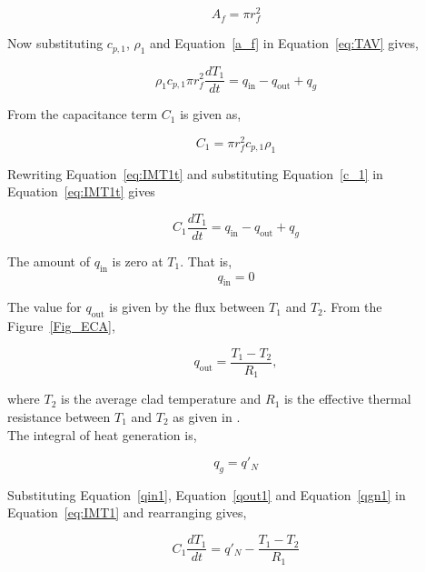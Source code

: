 \begin{equation}
A_f=\pi r_f^2 \label{a_f}
\end{equation}

Now substituting $c_{p,1}$, $\rho_1$ and Equation~\ref{a_f} in  Equation~\ref{eq:TAV} gives,

\begin{equation}
\rho_1 c_{p,1} \pi r_f^2 \frac{dT_1}{dt} = q_{\mathrm{in}}-q_{\mathrm{out}}+q_g \label{eq:IMT1t}
\end{equation}

From  the capacitance term $C_1$ is given as,

\begin{equation}
C_1  = \pi r_f^2 c_{p,1}\rho_1 \label{c_1}
\end{equation}

Rewriting Equation~\ref{eq:IMT1t} and substituting Equation~\ref{c_1} in Equation~\ref{eq:IMT1t} gives

\begin{equation}
C_1 \frac{dT_1}{dt} = q_{\mathrm{in}}-q_{\mathrm{out}}+q_g \label{eq:IMT1}
\end{equation}

The amount of $q_{\text{in}}$  is zero at $T_1$. That is,
\begin{equation}
q_{\text{in}}=0 \label{qin1}
\end{equation}

The value for $q_{\text{out}}$ is given by the flux between $T_1$ and $T_2$.
From the Figure~\ref{Fig_ECA},

\begin{equation}
q_{\text{out}}=\frac{T_1-T_2}{R_1}, \label{qout1}
\end{equation}

where $T_2$ is the average clad temperature and $R_1$ is the effective thermal
resistance between $T_1$ and $T_2$ as given in .
\\

The integral of heat generation is,

\begin{equation}
q_{g}=q'_N \label{qgn1}
\end{equation}

Substituting Equation~\ref{qin1}, Equation~\ref{qout1} and Equation~\ref{qgn1}
in Equation~\ref{eq:IMT1}  and rearranging gives,

\begin{equation}
C_1 \frac{dT_1}{dt} = q'_N -\frac{T_1 -T_2}{R_1}
\end{equation}

